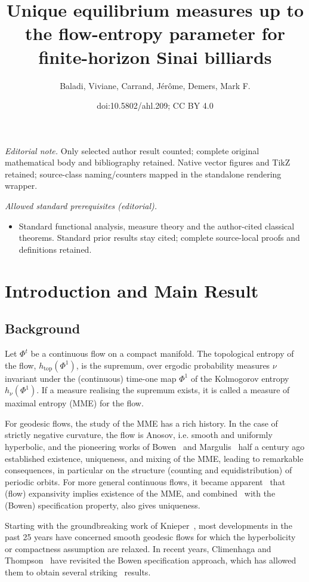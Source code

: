 \documentclass[10pt]{amsart}
\title{Unique equilibrium measures up to the flow-entropy parameter for finite-horizon Sinai billiards}
\author{Baladi, Viviane, Carrand, Jérôme, Demers, Mark F.}
\date{doi:10.5802/ahl.209; CC BY 4.0}
\theoremstyle{definition}\newtheorem{defi}[theo]{Definition}\newtheorem{rema}[theo]{Remark}\newtheorem{exam}[theo]{Example}\newtheorem{exem}[theo]{Example}\newtheorem{nota}[theo]{Notation}
\newcommand{\htop}{h_{\scriptstyle{\text{top}}}}
\begin{document}
\maketitle
\noindent\textit{Editorial note.} Only selected author result counted; complete original mathematical body and bibliography retained. Native vector figures and TikZ retained; source-class naming/counters mapped in the standalone rendering wrapper.\par\medskip
\noindent\textit{Allowed standard prerequisites (editorial).}\begin{itemize}
\item Standard functional analysis, measure theory and the author-cited classical theorems. Standard prior results stay cited; complete source-local proofs and definitions retained.
\end{itemize}\medskip

\section{Introduction and Main Result}


\subsection{Background}

Let $\Phi^t$ be a continuous flow on a compact manifold. The topological entropy of the flow, $\htop(\Phi^1)$, is the supremum, over ergodic probability measures $\nu$ invariant under the (continuous) time-one map $\Phi^1$ of the Kolmogorov entropy $h_\nu(\Phi ^1)$. If a measure realising the supremum exists, it is called a measure of maximal entropy (MME) for the flow.


For geodesic flows, the study of the MME has a rich history. In the case of strictly negative curvature, the flow is Anosov, i.e. smooth and uniformly hyperbolic, and the pioneering works of Bowen~\cite{Bow} and Margulis~\cite{Mar0, Mar} half a century ago established existence, uniqueness, and mixing of the MME, leading to remarkable consequences, in particular on the structure (counting and equidistribution) of periodic orbits. For more general continuous flows, it became apparent~\cite{Bo0, Bo1, BW} that (flow) expansivity implies existence of the MME, and combined~\cite{Fr} with the (Bowen) specification property, also gives uniqueness.

Starting with the groundbreaking work of Knieper~\cite{Kn}, most developments in the past 25 years have concerned smooth geodesic flows for which the hyperbolicity or compactness assumption are relaxed. In recent years, Climenhaga and Thompson~\cite{CT} have revisited the Bowen specification approach, which has allowed them to obtain several striking~\cite{BCFT,CKW} results.
\end{document}
